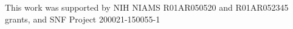 This work was supported by NIH NIAMS R01AR050520 and R01AR052345 grants, and SNF Project 200021-150055-1
